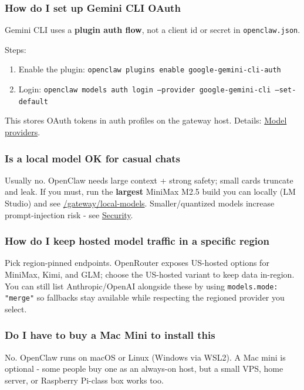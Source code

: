 \subsubsection{How do I set up Gemini CLI OAuth}


Gemini CLI uses a \textbf{plugin auth flow}, not a client id or secret in \texttt{openclaw.json}.

Steps:

\begin{enumerate}
  \item Enable the plugin: \texttt{openclaw plugins enable google-gemini-cli-auth}
  \item Login: \texttt{openclaw models auth login --provider google-gemini-cli --set-default}
\end{enumerate}


This stores OAuth tokens in auth profiles on the gateway host. Details: \href{/concepts/model-providers}{Model providers}.

\subsubsection{Is a local model OK for casual chats}


Usually no. OpenClaw needs large context + strong safety; small cards truncate and leak. If you must, run the \textbf{largest} MiniMax M2.5 build you can locally (LM Studio) and see \href{/gateway/local-models}{/gateway/local-models}. Smaller/quantized models increase prompt-injection risk - see \href{/gateway/security}{Security}.

\subsubsection{How do I keep hosted model traffic in a specific region}


Pick region-pinned endpoints. OpenRouter exposes US-hosted options for MiniMax, Kimi, and GLM; choose the US-hosted variant to keep data in-region. You can still list Anthropic/OpenAI alongside these by using \texttt{models.mode: "merge"} so fallbacks stay available while respecting the regioned provider you select.

\subsubsection{Do I have to buy a Mac Mini to install this}


No. OpenClaw runs on macOS or Linux (Windows via WSL2). A Mac mini is optional - some people
buy one as an always-on host, but a small VPS, home server, or Raspberry Pi-class box works too.

